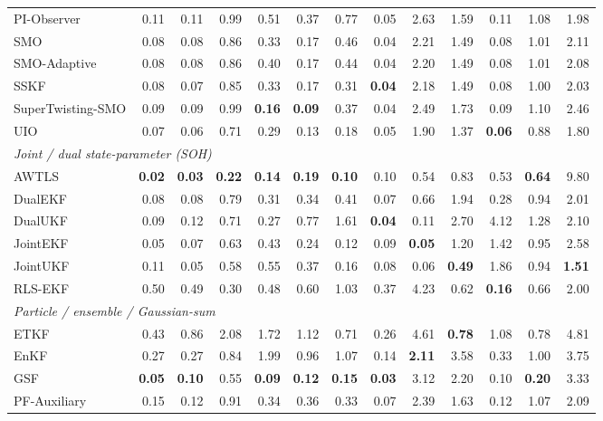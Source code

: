 \begin{longtable}{lrrrrrrrrrrrr}
\quad PI-Observer & 0.11 & 0.11 & 0.99 & 0.51 & 0.37 & 0.77 & 0.05 & 2.63 & 1.59 & 0.11 & 1.08 & 1.98 \\
\quad SMO & 0.08 & 0.08 & 0.86 & 0.33 & 0.17 & 0.46 & 0.04 & 2.21 & 1.49 & 0.08 & 1.01 & 2.11 \\
\quad SMO-Adaptive & 0.08 & 0.08 & 0.86 & 0.40 & 0.17 & 0.44 & 0.04 & 2.20 & 1.49 & 0.08 & 1.01 & 2.08 \\
\quad SSKF & 0.08 & 0.07 & 0.85 & 0.33 & 0.17 & 0.31 & \textbf{0.04} & 2.18 & 1.49 & 0.08 & 1.00 & 2.03 \\
\quad SuperTwisting-SMO & 0.09 & 0.09 & 0.99 & \textbf{0.16} & \textbf{0.09} & 0.37 & 0.04 & 2.49 & 1.73 & 0.09 & 1.10 & 2.46 \\
\quad UIO & 0.07 & 0.06 & 0.71 & 0.29 & 0.13 & 0.18 & 0.05 & 1.90 & 1.37 & \textbf{0.06} & 0.88 & 1.80 \\
\multicolumn{13}{l}{\textit{Joint / dual state-parameter (SOH)}} \\
\quad AWTLS & \textbf{0.02} & \textbf{0.03} & \textbf{0.22} & \textbf{0.14} & \textbf{0.19} & \textbf{0.10} & 0.10 & 0.54 & 0.83 & 0.53 & \textbf{0.64} & 9.80 \\
\quad DualEKF & 0.08 & 0.08 & 0.79 & 0.31 & 0.34 & 0.41 & 0.07 & 0.66 & 1.94 & 0.28 & 0.94 & 2.01 \\
\quad DualUKF & 0.09 & 0.12 & 0.71 & 0.27 & 0.77 & 1.61 & \textbf{0.04} & 0.11 & 2.70 & 4.12 & 1.28 & 2.10 \\
\quad JointEKF & 0.05 & 0.07 & 0.63 & 0.43 & 0.24 & 0.12 & 0.09 & \textbf{0.05} & 1.20 & 1.42 & 0.95 & 2.58 \\
\quad JointUKF & 0.11 & 0.05 & 0.58 & 0.55 & 0.37 & 0.16 & 0.08 & 0.06 & \textbf{0.49} & 1.86 & 0.94 & \textbf{1.51} \\
\quad RLS-EKF & 0.50 & 0.49 & 0.30 & 0.48 & 0.60 & 1.03 & 0.37 & 4.23 & 0.62 & \textbf{0.16} & 0.66 & 2.00 \\
\multicolumn{13}{l}{\textit{Particle / ensemble / Gaussian-sum}} \\
\quad ETKF & 0.43 & 0.86 & 2.08 & 1.72 & 1.12 & 0.71 & 0.26 & 4.61 & \textbf{0.78} & 1.08 & 0.78 & 4.81 \\
\quad EnKF & 0.27 & 0.27 & 0.84 & 1.99 & 0.96 & 1.07 & 0.14 & \textbf{2.11} & 3.58 & 0.33 & 1.00 & 3.75 \\
\quad GSF & \textbf{0.05} & \textbf{0.10} & 0.55 & \textbf{0.09} & \textbf{0.12} & \textbf{0.15} & \textbf{0.03} & 3.12 & 2.20 & 0.10 & \textbf{0.20} & 3.33 \\
\quad PF-Auxiliary & 0.15 & 0.12 & 0.91 & 0.34 & 0.36 & 0.33 & 0.07 & 2.39 & 1.63 & 0.12 & 1.07 & 2.09 \\

\end{longtable}
